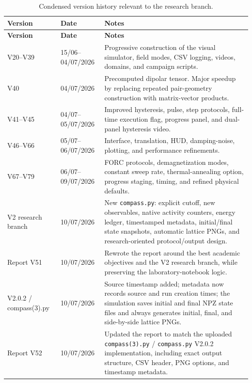 \documentclass[11pt,a4paper]{article}
\newcommand{\code}[1]{\texttt{#1}}
\begin{document}
\begin{longtable}{@{}p{2.2cm}p{2.6cm}p{10.0cm}@{}}
\caption{Condensed version history relevant to the research branch.}\label{tab:versions}\\
\toprule
\textbf{Version} & \textbf{Date} & \textbf{Notes}\\
\midrule
\endfirsthead
\toprule
\textbf{Version} & \textbf{Date} & \textbf{Notes}\\
\midrule
\endhead
\bottomrule
\endfoot
V20--V39 & 15/06--04/07/2026 & Progressive construction of the visual simulator, field modes, CSV logging, videos, domains, and campaign scripts.\\
V40 & 04/07/2026 & Precomputed dipolar tensor. Major speedup by replacing repeated pair-geometry construction with matrix-vector products.\\
V41--V45 & 04/07--05/07/2026 & Improved hysteresis, pulse, step protocols, full-time execution flag, progress panel, and dual-panel hysteresis video.\\
V46--V66 & 05/07--06/07/2026 & Interface, translation, HUD, damping-noise, plotting, and performance refinements.\\
V67--V79 & 06/07--09/07/2026 & FORC protocols, demagnetization modes, constant sweep rate, thermal-annealing option, progress staging, timing, and refined physical defaults.\\
V2 research branch & 10/07/2026 & New \code{compass.py}: explicit cutoff, new observables, native activity counters, energy ledger, timestamped metadata, initial/final state snapshots, automatic lattice PNGs, and research-oriented protocol/output design.\\
Report V51 & 10/07/2026 & Rewrote the report around the best academic objectives and the V2 research branch, while preserving the laboratory-notebook logic.\\
V2.0.2 / compass(3).py & 10/07/2026 & Source timestamp added; metadata now records source and run creation times; the simulation saves initial and final NPZ state files and always generates initial, final, and side-by-side lattice PNGs.\\
Report V52 & 10/07/2026 & Updated the report to match the uploaded \code{compass(3).py} / \code{compass.py} V2.0.2 implementation, including exact output structure, CSV header, PNG options, and timestamp metadata.\\
\end{longtable}
\end{document}
